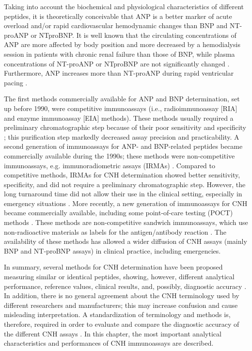 \documentclass[14pt,a4paper,onecolumn]{extarticle}
\begin{document}
Taking into account the biochemical and physiological characteristics of different
peptides, it is theoretically conceivable that ANP is a better marker of acute overload
and/or rapid cardiovascular hemodynamic changes than BNP and NT-proANP or NTproBNP. It is well known that the circulating concentrations of ANP are more affected
by body position and more decreased by a hemodialysis session in patients with chronic renal failure than those of BNP, while plasma concentrations of NT-proANP or NTproBNP are not significantly changed \citep{bib21} \citep{bib24}. Furthermore, ANP increases more than
NT-proANP during rapid ventricular pacing \citep{bib212}.

The first methods commercially available for ANP and BNP determination, set up
before 1990, were competitive immunoassays (i.e., radioimmunoassay [RIA] and enzyme
immunoassay [EIA] methods). These methods usually required a preliminary chromatographic step because of their poor sensitivity and specificity \citep{bib21}; this purification
step markedly decreased assay precision and practicability. A second generation of
immunoassays for ANP- and BNP-related peptides became commercially available during the 1990s; these methods were non-competitive immunoassays, e.g. immunoradiometric assays (IRMAs) \citep{bib213} \citep{bib214}. Compared to competitive methods, IRMAs for CNH
determination showed better sensitivity, specificity, and did not require a preliminary chromatographic step. However, the long turnaround time did not allow their use in the clinical setting, especially in emergency situations \citep{bib21} \citep{bib22} \citep{bib23} \citep{bib24}. More recently, a new generation of
immunoassays for CNH became commercially available, including some point-of-care
testing (POCT) methods \citep{bib215}. These methods are non-competitive sandwich immunoassays, which use non-radioactive materials as labels for the antigen/antibody reaction \citep{bib23} \citep{bib24}. The availability of these methods has allowed a wider diffusion of CNH assays (mainly BNP and NT-proBNP assays) in clinical practice, including emergencies.

In summary, several methods for CNH determination have been proposed measuring similar or identical peptides, showing, however, different analytical performance, reference values, clinical results, and, possibly, diagnostic accuracy \citep{bib23} \citep{bib24}. In addition, there
is no general agreement about the CNH terminology used by different researchers and
manufacturers; this may increase confusion and cause misleading interpretation. A
standardization of terminology and methods is, therefore, required in order to evaluate and compare the diagnostic accuracy of the different CNH assays \citep{bib24}. In this chapter, the most important analytical characteristics and performances of CNH immunoassays are described.
\end{document}
